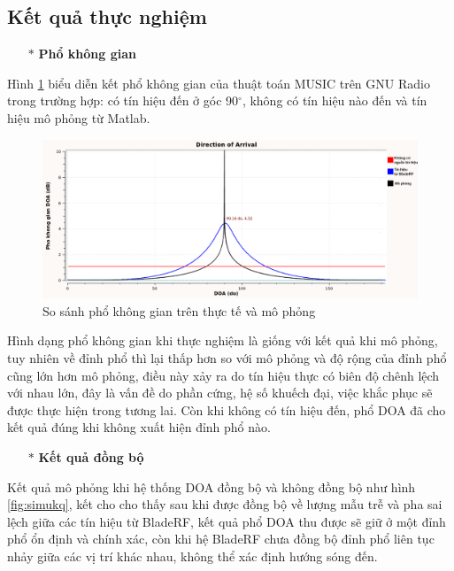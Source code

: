 \subsection{Kết quả thực nghiệm}

\begin{itemize}
	\item[$\ast$] \textbf{Phổ không gian}
\end{itemize} 

Hình \ref{fig:kqsync} biểu diễn kết phổ không gian của thuật toán MUSIC trên GNU Radio trong trường hợp: có tín hiệu đến ở góc 90$^{\circ}$, không có tín hiệu nào đến và tín hiệu mô phỏng từ Matlab.

\begin{figure} [!h]
	\centering
	\includegraphics[width=1\linewidth]{figures/kqsync.png}
	\caption{So sánh phổ không gian trên thực tế và mô phỏng}
	\label{fig:kqsync}
\end{figure}

Hình dạng phổ không gian khi thực nghiệm là giống với kết quả khi mô phỏng, tuy nhiên về đỉnh phổ thì lại thấp hơn so với mô phỏng và độ rộng của đỉnh phổ cũng lớn hơn mô phỏng, điều này xảy ra do tín hiệu thực có biên độ chênh lệch với nhau lớn, đây là vấn đề do phần cứng, hệ số khuếch đại, việc khắc phục sẽ được thực hiện trong tương lai. Còn khi không có tín hiệu đến, phổ DOA đã cho kết quả đúng khi không xuất hiện đỉnh phổ nào.

\begin{itemize}
	\item[$\ast$] \textbf{Kết quả đồng bộ}
\end{itemize} 

Kết quả mô phỏng khi hệ thống DOA đồng bộ và không đồng bộ như hình \ref{fig:simukq}, kết cho cho thấy sau khi được đồng bộ về lượng mẫu trễ và pha sai lệch giữa các tín hiệu từ BladeRF, kết quả phổ DOA thu được sẽ giữ ở một đỉnh phổ ổn định và chính xác, còn khi hệ BladeRF chưa đồng bộ đỉnh phổ liên tục nhảy giữa các vị trí khác nhau, không thể xác định hướng sóng đến.

